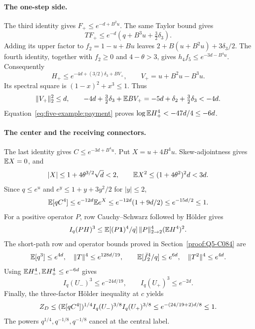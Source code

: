 \paragraph{The one-step side.}
The third identity gives
\(F_+\le e^{-d+B^2u}\). The same Taylor bound gives
\[
 TF_+\le e^{-d}(q+B^3u+\tfrac32\delta_3).
\]
Adding its upper factor to \(f_2=1-u+Bu\) leaves
\(2+B(u+B^2u)+3\delta_3/2\). The fourth identity, together
with \(f_2\ge0\) and \(4-\theta>3\), gives
\(h_4f_5\le e^{-3d-B^4u}\). Consequently
\[
 H_+\le e^{-4d+(3/2)\delta_3+BV_+},\qquad
 V_+=u+B^2u-B^3u.
\]
Its spectral square is \((1-x)^2+x^3\le1\). Thus
\[
 \|V_+\|_2^2\le d,\qquad
 -4d+\tfrac32\delta_3+\mathbb E BV_+
 =-5d+\delta_2+\tfrac32\delta_3<-4d.
\]
Equation~\eqref{eq:five-example:payment} proves
\(\log\mathbb E H_+^4<-47d/4\le-6d\).

\paragraph{The center and the receiving connectors.}
The last identity gives \(C\le e^{-3d+B^4u}\).
Put \(X=u+4B^4u\). Skew-adjointness gives \(\mathbb E X=0\), and
\[
 |X|\le1+4\theta^{3/2}\sqrt d<2,\qquad
 \mathbb E X^2\le(1+4\theta^2)^2d<3d.
\]
Since \(q\le e^u\) and \(e^y\le1+y+3y^2/2\) for \(|y|\le2\),
\[
 \mathbb E[qC^4]\le e^{-12d}\mathbb E e^X
 \le e^{-12d}(1+9d/2)\le e^{-15d/2}\le1.
\]
For a positive operator \(P\), row Cauchy--Schwarz followed by
H\"older gives
\[
 I_q(PH)^3\le\mathbb E[(P\mathbf1)^4/q]\,\|P\|_{2\to2}^4(\mathbb E H^4)^2.
\]
The short-path row and operator bounds proved in
Section~\ref{proof:Q5-C084} are
\[
 \mathbb E[q^3]\le e^{4d},\quad \|T\|^4\le e^{128d/19},\qquad
 \mathbb E[\bar f_2^4/q]\le e^{6d},\quad \|T^2\|^4\le e^{4d}.
\]
Using \(\mathbb E H_-^4,\mathbb E H_+^4\le e^{-6d}\) gives
\[
 I_q(U_-)^3\le e^{-24d/19},\qquad I_q(U_+)^3\le e^{-2d}.
\]
Finally, the three-factor H\"older inequality at \(c\) yields
\[
 Z_D\le(\mathbb E[qC^4])^{1/4}
           I_q(U_-)^{3/8}I_q(U_+)^{3/8}
 \le e^{-(24/19+2)d/8}\le1.
\]
The powers \(q^{1/4},q^{-1/8},q^{-1/8}\) cancel at the central
label.

